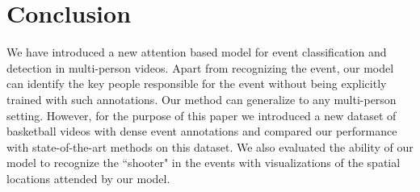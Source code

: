 \section{Conclusion}
We have introduced a new attention based model for event classification and
detection in multi-person videos. Apart from recognizing the event, our model
can identify the key people responsible for the event without being explicitly
trained with such annotations. Our method can generalize to any
multi-person setting. However, for the purpose of this paper we introduced a
new dataset of basketball videos with dense event annotations and compared our
performance with state-of-the-art methods on this dataset.  We also evaluated
the ability of our model to recognize the ``shooter" in the events with
visualizations of the spatial locations attended by our model.
